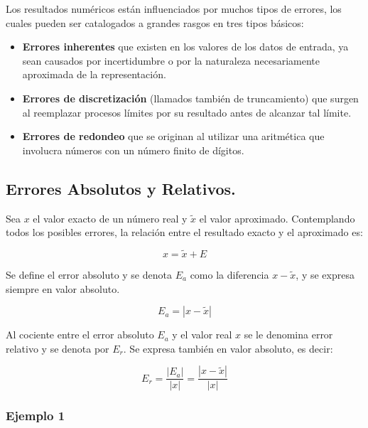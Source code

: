 \documentclass[
]{article}
\providecommand{\tightlist}{%
  \setlength{\itemsep}{0pt}\setlength{\parskip}{0pt}}
\begin{document}
Los resultados numéricos están influenciados por muchos tipos de
errores, los cuales pueden ser catalogados a grandes rasgos en tres
tipos básicos:

\begin{itemize}
\tightlist
\item
  \textbf{Errores inherentes} que existen en los valores de los datos de
  entrada, ya sean causados por incertidumbre o por la naturaleza
  necesariamente aproximada de la representación.
\item
  \textbf{Errores de discretización} (llamados también de truncamiento)
  que surgen al reemplazar procesos límites por su resultado antes de
  alcanzar tal límite.
\item
  \textbf{Errores de redondeo} que se originan al utilizar una
  aritmética que involucra números con un número finito de dígitos.
\end{itemize}

\subsection{Errores Absolutos y
Relativos.}\label{errores-absolutos-y-relativos.}

Sea \(x\) el valor exacto de un número real y \(\tilde{x}\) el valor
aproximado. Contemplando todos los posibles errores, la relación entre
el resultado exacto y el aproximado es:

\[
x=\tilde{x}+E
\]

Se define el error absoluto y se denota \(E_a\) como la diferencia
\(x − \tilde{x}\), y se expresa siempre en valor absoluto.

\[
E_a = |x - \tilde{x}|
\]

Al cociente entre el error absoluto \(E_a\) y el valor real \(x\) se le
denomina error relativo y se denota por \(E_r\). Se expresa también en
valor absoluto, es decir:

\[
E_r =\dfrac{|E_a|}{|x|} = \dfrac{|x - \tilde{x}|}{|x|}
\]

\subsubsection{Ejemplo 1}\label{ejemplo-1}
\end{document}
